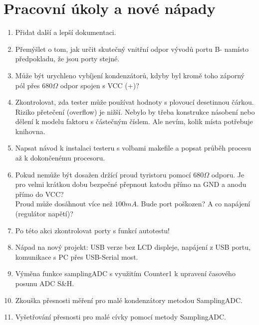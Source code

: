 \chapter{Pracovní úkoly a nové nápady}
\label{sec:todo}
\vspace*{-1cm}
\begin{enumerate}
\item Přidat další a lepší dokumentaci.
\item Přemýšlet o tom, jak určit skutečný vnitřní odpor vývodů portu B- namísto předpokladu, že jsou porty  stejné.
\item Může být urychleno vybíjení kondenzátorů, kdyby byl kromě toho záporný pól přes \(680\Omega\) odpor
spojen s VCC (+)?
\item Zkontrolovat, zda tester může používat hodnoty s plovoucí desetinnou čárkou.
Riziko přetečení (overflow) je nižší.
Nebylo by třeba konstrukce násobení nebo dělení k modelu faktoru s částečným číslem.
Ale nevím, kolik místa potřebuje knihovna.
\item Napsat návod k instalaci testeru s volbami makefile a popsat průběh procesu až k dokončenému procesoru.
\item Pokud  nemůže být dosažen držící proud tyristoru pomocí \(680\Omega\) odporu. Je pro velmi krátkou dobu bezpečné přepnout katodu přímo na GND a anodu přímo do VCC?
\\Proud může dosáhnout více než \(100mA\). Bude port poškozen? A co napájení (regulátor napětí)?
\item Po této akci zkontrolovat porty s funkcí autotestu!
\item Nápad na nový projekt: USB verze bez LCD displeje, napájení z USB portu, komunikace s PC přes USB-Serial  most.
\item Výměna funkce samplingADC s využitím Counter1 k upravení časového posunu ADC S\&H.
\item Zkouška přesnosti měření pro malé kondenzátory metodou SamplingADC.
\item Vyšetřování přesnosti pro malé cívky pomocí metody SamplingADC.
\end{enumerate}

